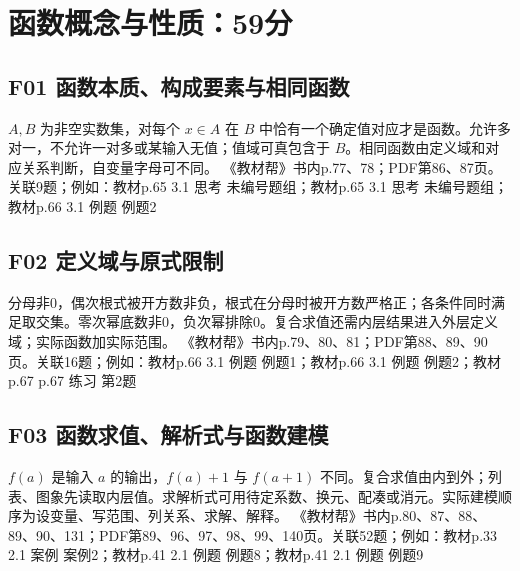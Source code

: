 \section{函数概念与性质：59分}
\par\medskip\noindent\begin{minipage}{\linewidth}\subsection{F01 函数本质、构成要素与相同函数}
$A,B$ 为非空实数集，对每个 $x\in A$ 在 $B$ 中恰有一个确定值对应才是函数。允许多对一，不允许一对多或某输入无值；值域可真包含于 $B$。相同函数由定义域和对应关系判断，自变量字母可不同。
{\small 《教材帮》书内p.77、78；PDF第86、87页。关联9题；例如：教材p.65 3.1 思考 未编号题组；教材p.65 3.1 思考 未编号题组；教材p.66 3.1 例题 例题2}\par\end{minipage}\par
\par\medskip\noindent\begin{minipage}{\linewidth}\subsection{F02 定义域与原式限制}
分母非0，偶次根式被开方数非负，根式在分母时被开方数严格正；各条件同时满足取交集。零次幂底数非0，负次幂排除0。复合求值还需内层结果进入外层定义域；实际函数加实际范围。
{\small 《教材帮》书内p.79、80、81；PDF第88、89、90页。关联16题；例如：教材p.66 3.1 例题 例题1；教材p.66 3.1 例题 例题2；教材p.67 p.67 练习 第2题}\par\end{minipage}\par
\par\medskip\noindent\begin{minipage}{\linewidth}\subsection{F03 函数求值、解析式与函数建模}
$f(a)$ 是输入 $a$ 的输出，$f(a)+1$ 与 $f(a+1)$ 不同。复合求值由内到外；列表、图象先读取内层值。求解析式可用待定系数、换元、配凑或消元。实际建模顺序为设变量、写范围、列关系、求解、解释。
{\small 《教材帮》书内p.80、87、88、89、90、131；PDF第89、96、97、98、99、140页。关联52题；例如：教材p.33 2.1 案例 案例2；教材p.41 2.1 例题 例题8；教材p.41 2.1 例题 例题9}\par\end{minipage}\par
